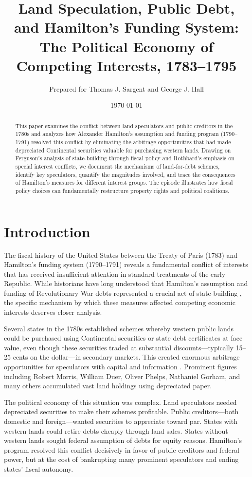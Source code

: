 \documentclass[12pt]{article}
\title{Land Speculation, Public Debt, and Hamilton's Funding System:\\
The Political Economy of Competing Interests, 1783--1795}
\author{Prepared for Thomas J. Sargent and George J. Hall}
\date{\today}
\begin{document}
\maketitle

\begin{abstract}
This paper examines the conflict between land speculators and public creditors in the 1780s and analyzes how Alexander Hamilton's assumption and funding program (1790--1791) resolved this conflict by eliminating the arbitrage opportunities that had made depreciated Continental securities valuable for purchasing western lands. Drawing on Ferguson's analysis of state-building through fiscal policy and Rothbard's emphasis on special interest conflicts, we document the mechanisms of land-for-debt schemes, identify key speculators, quantify the magnitudes involved, and trace the consequences of Hamilton's measures for different interest groups. The episode illustrates how fiscal policy choices can fundamentally restructure property rights and political coalitions.
\end{abstract}

\section{Introduction}

The fiscal history of the United States between the Treaty of Paris (1783) and Hamilton's funding system (1790--1791) reveals a fundamental conflict of interests that has received insufficient attention in standard treatments of the early Republic. While historians have long understood that Hamilton's assumption and funding of Revolutionary War debts represented a crucial act of state-building \citep{Ferguson1961}, the specific mechanism by which these measures affected competing economic interests deserves closer analysis.

Several states in the 1780s established schemes whereby western public lands could be purchased using Continental securities or state debt certificates at face value, even though these securities traded at substantial discounts---typically 15--25 cents on the dollar---in secondary markets. This created enormous arbitrage opportunities for speculators with capital and information \citep{Rothbard1999, Rothbard2011}. Prominent figures including Robert Morris, William Duer, Oliver Phelps, Nathaniel Gorham, and many others accumulated vast land holdings using depreciated paper.

The political economy of this situation was complex. Land speculators needed depreciated securities to make their schemes profitable. Public creditors---both domestic and foreign---wanted securities to appreciate toward par. States with western lands could retire debts cheaply through land sales. States without western lands sought federal assumption of debts for equity reasons. Hamilton's program resolved this conflict decisively in favor of public creditors and federal power, but at the cost of bankrupting many prominent speculators and ending states' fiscal autonomy.
\end{document}
